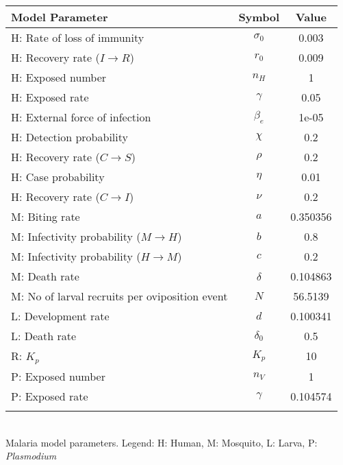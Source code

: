 \begin{table}
\noindent
\begin{tabular}{lcc}
{\bf Model Parameter} & {\bf Symbol} & {\bf Value}\\
\hline\hline
  H: Rate of loss of immunity & $\sigma_0$ & 0.003\\
  H: Recovery rate ($I \rightarrow R$) & $r_0$ & 0.009\\
  H: Exposed number & $n_H$ & 1\\
  H: Exposed rate & $\gamma$ & 0.05\\
  H: External force of infection & $\beta_e$ & 1e-05\\
  H: Detection probability & $\chi$ & 0.2\\
  H: Recovery rate ($C \rightarrow S$) & $\rho$ & 0.2\\
  H: Case probability & $\eta$ & 0.01\\
  H: Recovery rate ($C \rightarrow I$) & $\nu$ & 0.2\\
  M: Biting rate & $a$ & 0.350356\\
  M: Infectivity probability ($M \rightarrow H$) & $b$ & 0.8\\
  M: Infectivity probability ($H \rightarrow M$) & $c$ & 0.2\\
  M: Death rate & $\delta$ & 0.104863\\
  M: No of larval recruits per oviposition event & $N$ & 56.5139\\
  L: Development rate & $d$ & 0.100341\\
  L: Death rate & $\delta_0$ & 0.5\\
  R: $K_p$ & $K_p$ & 10\\
  P: Exposed number & $n_V$ & 1\\
  P: Exposed rate & $\gamma$ & 0.104574\\
\hline\hline
\smallskip
\end{tabular}\\
 Malaria model parameters. Legend: {\small H: Human, M: Mosquito, L: Larva, P: {\em Plasmodium}}
\end{table}

